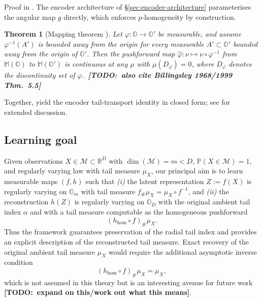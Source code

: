\documentclass{article}
\newtheorem{theorem}{Theorem}
\theoremstyle{definition}
\newcommand{\cM}{\mathcal{M}}
\newcommand{\todo}[1]{{\color{red}\textbf{[TODO:~#1]}}}
\begin{document}
\noindent Proof in . The encoder architecture of \S\ref{sec:encoder-architecture} parameterises the angular map \(g\) directly, which enforces \(p\)-homogeneity by construction.

\begin{theorem}[Mapping theorem {\cite[Theorem~2.3]{lindskog_regularly_2014}}]
\label{thm:mapping-theorem}
Let \(\varphi:\mathbb{O}\to\mathbb{O}'\) be measurable, and assume \(\varphi^{-1}(A')\) is bounded away from the origin for every measurable \(A'\subset\mathbb{O}'\) bounded away from the origin of \(\mathbb{O}'\). Then the pushforward map \(\widehat\varphi:\nu\mapsto\nu\circ\varphi^{-1}\) from \(\mathbb{M}(\mathbb{O})\) to \(\mathbb{M}(\mathbb{O}')\) is continuous at any \(\mu\) with \(\mu(D_\varphi)=0\), where \(D_\varphi\) denotes the discontinuity set of \(\varphi\).~\todo{also cite Billingsley 1968/1999 Thm.~5.5}
\end{theorem}

\noindent Together,  yield the encoder tail-transport identity  in closed form; see  for extended discussion.

\subsection{Learning goal}
\label{sec:prelim:goal}

Given observations \(X \in \cM \subset \mathbb{R}^D\) with
\(\dim(\cM)=m<D\), \(\mathbb{P}(X\in\cM)=1\), and regularly varying law
with tail measure \(\mu_X\), our principal aim is to learn measurable maps
\((f,h)\) such that \emph{(i)} the latent representation
\(Z:=f(X)\) is regularly varying on \(\mathbb{O}_m\) with tail measure
\(f_{\#}\mu_X=\mu_X\circ f^{-1}\), and \emph{(ii)} the reconstruction
\(h(Z)\) is regularly varying on \(\mathbb{O}_D\) with the original ambient
tail index \(\alpha\) and with a tail measure computable as the homogeneous
pushforward
\[
(h_{\mathrm{hom}}\circ f)_{\#}\mu_X.
\]
Thus the framework guarantees preservation of the radial tail index and
provides an explicit description of the reconstructed tail measure. Exact
recovery of the original ambient tail measure \(\mu_X\) would require the
additional asymptotic inverse condition
\[
(h_{\mathrm{hom}}\circ f)_{\#}\mu_X=\mu_X,
\]
which is not assumed in this theory but is an interesting avenue for future work \todo{expand on this/work out what this means}.
\end{document}
